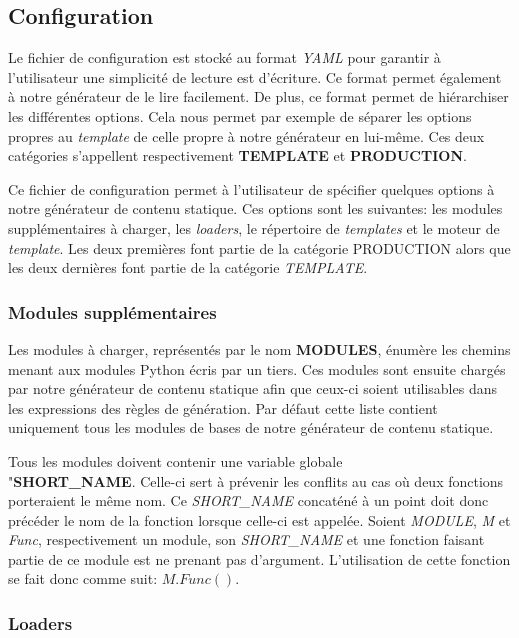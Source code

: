 	
	\subsection{Configuration}
	
		Le fichier de configuration est stocké au format \textit{YAML} pour garantir à l'utilisateur une simplicité de lecture est d'écriture. Ce format permet également à notre générateur de le lire facilement. De plus, ce format permet de hiérarchiser les différentes options. Cela nous permet par exemple de séparer les options propres au \textit{template} de celle propre à notre générateur en lui-même. Ces deux catégories s'appellent respectivement \textbf{TEMPLATE} et \textbf{PRODUCTION}.
		
		Ce fichier de configuration permet à l'utilisateur de spécifier quelques options à notre générateur de contenu statique. Ces options sont les suivantes: les modules supplémentaires à charger, les \textit{loaders}, le répertoire de \textit{templates} et le moteur de \textit{template}. Les deux premières font partie de la catégorie PRODUCTION alors que les deux dernières font partie de la catégorie \textit{TEMPLATE}.
		
		\subsubsection*{Modules supplémentaires}
		
		Les modules à charger, représentés par le nom \textbf{MODULES}, énumère les chemins menant aux modules Python écris par un tiers. Ces modules sont ensuite chargés par notre générateur de contenu statique afin que ceux-ci soient utilisables dans les expressions des règles de génération. Par défaut cette liste contient uniquement tous les modules de bases de notre générateur de contenu statique.
		
		Tous les modules doivent contenir une variable globale\\ "\textbf{SHORT\_NAME}. Celle-ci sert à prévenir les conflits au cas où deux fonctions porteraient le même nom. Ce \textit{SHORT\_NAME} concaténé à un point doit donc précéder le nom de la fonction lorsque celle-ci est appelée. Soient \textit{MODULE}, \textit{M} et \textit{Func}, respectivement un module, son \textit{SHORT\_NAME} et une fonction faisant partie de ce module est ne prenant pas d'argument. L'utilisation de cette fonction se fait donc comme suit: $M.Func()$.
				
		\subsubsection*{Loaders}
		
